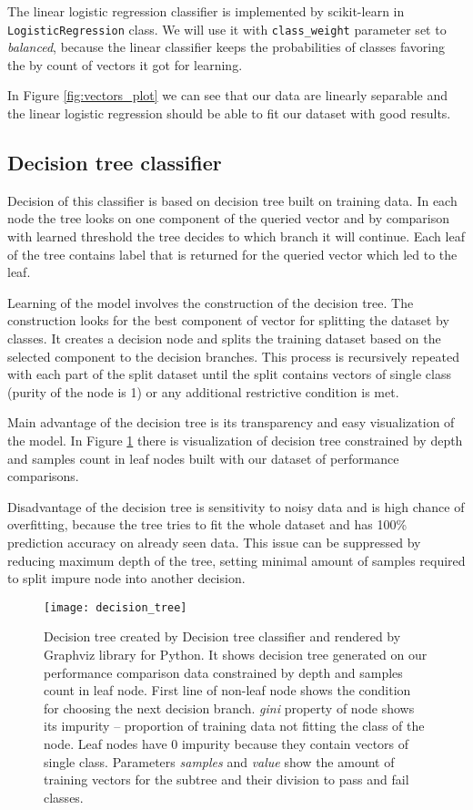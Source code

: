 The linear logistic regression classifier is implemented by scikit-learn in
\texttt{Logistic\-Regression} class. We will use it with \texttt{class\_weight}
parameter set to \emph{balanced}, because the linear classifier keeps the
probabilities of classes favoring the by count of vectors it got for learning.

In Figure \ref{fig:vectors_plot} we can see that our data are linearly separable
and the linear logistic regression should be able to fit our dataset with good results.

\subsection{Decision tree classifier}
Decision of this classifier is based on decision tree built on training data.
In each node the tree looks on one component of the queried vector and by
comparison with learned threshold the tree decides to which branch it will
continue. Each leaf of the tree contains label that is returned for the queried
vector which led to the leaf.

Learning of the model involves the construction of the decision tree. The
construction looks for the best component of vector for splitting the dataset by
classes. It creates a decision node and splits the training dataset based on the
selected component to the decision branches. This process is recursively
repeated with each part of the split dataset until the split contains vectors of
single class (purity of the node is 1) or any additional restrictive condition
is met.

Main advantage of the decision tree is its transparency and easy visualization
of the model. In Figure \ref{fig:decision_tree} there is visualization of
decision tree constrained by depth and samples count in leaf nodes built with
our dataset of performance comparisons.

Disadvantage of the decision tree is sensitivity to noisy data and is high
chance of overfitting, because the tree tries to fit the whole dataset and has
100\% prediction accuracy on already seen data. This issue can be suppressed by
reducing maximum depth of the tree, setting minimal amount of samples required
to split impure node into another decision.

\begin{figure}
  \centering
  \texttt{[image: decision\_tree]}
  \caption{Decision tree created by Decision tree classifier and rendered by
    Graphviz library for Python. It shows decision tree generated on our
    performance comparison data constrained by depth and samples count in leaf
    node. First line of non-leaf node shows the condition for choosing the next
    decision branch. \emph{gini} property of node shows its impurity --
    proportion of training data not fitting the class of the node. Leaf nodes
    have 0 impurity because they contain vectors of single class. Parameters
    \emph{samples} and \emph{value} show the amount of training vectors for the
    subtree and their division to pass and fail classes.}
  \label{fig:decision_tree}
\end{figure}

